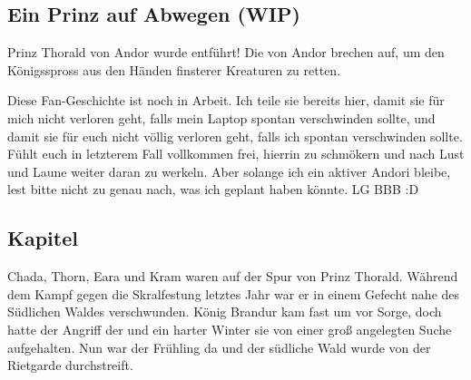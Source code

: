 \begin{chapterbox}
    \chapter{Ein Prinz auf Abwegen (WIP)}
    \label{wip-ein-prinz-auf-abwegen}

    Prinz Thorald von Andor wurde entführt! Die  von Andor brechen auf, um den Königsspross aus den Händen finsterer Kreaturen zu retten.
\end{chapterbox}



Diese Fan-Geschichte ist noch in Arbeit. Ich teile sie bereits hier, damit sie für mich nicht verloren geht, falls mein Laptop spontan verschwinden sollte, und damit sie für euch nicht völlig verloren geht, falls ich spontan verschwinden sollte. Fühlt euch in letzterem Fall vollkommen frei, hierrin zu schmökern und nach Lust und Laune weiter daran zu werkeln. Aber solange ich ein aktiver Andori bleibe, lest bitte nicht zu genau nach, was ich geplant haben könnte. LG BBB :D



\newpage
\section{Kapitel}

Chada, Thorn, Eara und Kram waren auf der Spur von Prinz Thorald. Während dem Kampf gegen die Skralfestung letztes Jahr war er in einem Gefecht nahe des Südlichen Waldes verschwunden. König Brandur kam fast um vor Sorge, doch hatte der Angriff der  und ein harter Winter sie von einer groß angelegten Suche aufgehalten. Nun war der Frühling da und der südliche Wald wurde von der Rietgarde durchstreift.